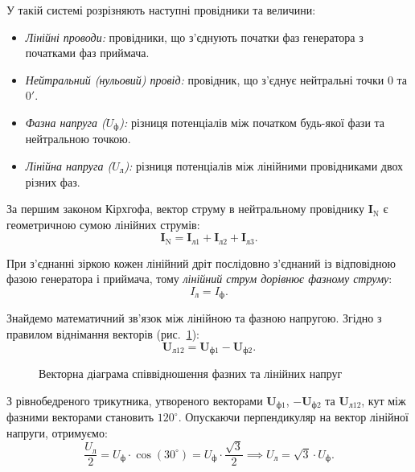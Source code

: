 У такій системі розрізняють наступні провідники та величини:
\begin{itemize}
    \item \emph{Лінійні проводи:} провідники, що з'єднують початки фаз генератора з початками фаз приймача.
    \item \emph{Нейтральний (нульовий) провід:} провідник, що з'єднує нейтральні точки $0$ та $0'$.
    \item \emph{Фазна напруга ($U_\text{ф}$):} різниця потенціалів між початком будь-якої фази та нейтральною точкою.
    \item \emph{Лінійна напруга ($U_\text{л}$):} різниця потенціалів між лінійними провідниками двох різних фаз.
\end{itemize}

За першим законом Кірхгофа, вектор струму в нейтральному провіднику $\mathbf{I}_\text{N}$ є геометричною сумою лінійних струмів:
\begin{equation}
	\mathbf{I}_\text{N} = \mathbf{I}_{\text{л}1} + \mathbf{I}_{\text{л}2} + \mathbf{I}_{\text{л}3}.
\end{equation}

При з'єднанні зіркою кожен лінійний дріт послідовно з'єднаний із відповідною фазою генератора і приймача, тому \emph{лінійний струм дорівнює фазному струму}:
\begin{equation}
	I_\text{л} = I_\text{ф}.
\end{equation}

Знайдемо математичний зв'язок між лінійною та фазною напругою. Згідно з правилом віднімання векторів (рис.~\ref{pic:ThreePhaseVectorDiagram}):
\begin{equation}
	\mathbf{U}_{\text{л}12} = \mathbf{U}_{\text{ф}1} - \mathbf{U}_{\text{ф}2}.
\end{equation}

\begin{figure}[h!]
	\centering
	\caption{Векторна діаграма співвідношення фазних та лінійних напруг}
	\label{pic:ThreePhaseVectorDiagram}
\end{figure}

З рівнобедреного трикутника, утвореного векторами $\mathbf{U}_{\text{ф}1}$, $-\mathbf{U}_{\text{ф}2}$ та $\mathbf{U}_{\text{л}12}$, кут між фазними векторами становить $120^\circ$. Опускаючи перпендикуляр на вектор лінійної напруги, отримуємо:
\begin{equation}
	\frac{U_\text{л}}{2} = U_\text{ф} \cdot \cos(30^\circ) = U_\text{ф} \cdot \frac{\sqrt{3}}{2} \implies U_\text{л} = \sqrt{3} \cdot U_\text{ф}.
\end{equation}

